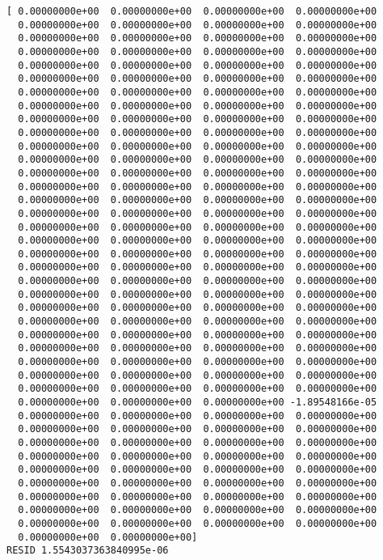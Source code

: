 \documentclass[11pt]{article}
\begin{document}
    \begin{Verbatim}[commandchars=\\\{\}]
[ 0.00000000e+00  0.00000000e+00  0.00000000e+00  0.00000000e+00
  0.00000000e+00  0.00000000e+00  0.00000000e+00  0.00000000e+00
  0.00000000e+00  0.00000000e+00  0.00000000e+00  0.00000000e+00
  0.00000000e+00  0.00000000e+00  0.00000000e+00  0.00000000e+00
  0.00000000e+00  0.00000000e+00  0.00000000e+00  0.00000000e+00
  0.00000000e+00  0.00000000e+00  0.00000000e+00  0.00000000e+00
  0.00000000e+00  0.00000000e+00  0.00000000e+00  0.00000000e+00
  0.00000000e+00  0.00000000e+00  0.00000000e+00  0.00000000e+00
  0.00000000e+00  0.00000000e+00  0.00000000e+00  0.00000000e+00
  0.00000000e+00  0.00000000e+00  0.00000000e+00  0.00000000e+00
  0.00000000e+00  0.00000000e+00  0.00000000e+00  0.00000000e+00
  0.00000000e+00  0.00000000e+00  0.00000000e+00  0.00000000e+00
  0.00000000e+00  0.00000000e+00  0.00000000e+00  0.00000000e+00
  0.00000000e+00  0.00000000e+00  0.00000000e+00  0.00000000e+00
  0.00000000e+00  0.00000000e+00  0.00000000e+00  0.00000000e+00
  0.00000000e+00  0.00000000e+00  0.00000000e+00  0.00000000e+00
  0.00000000e+00  0.00000000e+00  0.00000000e+00  0.00000000e+00
  0.00000000e+00  0.00000000e+00  0.00000000e+00  0.00000000e+00
  0.00000000e+00  0.00000000e+00  0.00000000e+00  0.00000000e+00
  0.00000000e+00  0.00000000e+00  0.00000000e+00  0.00000000e+00
  0.00000000e+00  0.00000000e+00  0.00000000e+00  0.00000000e+00
  0.00000000e+00  0.00000000e+00  0.00000000e+00  0.00000000e+00
  0.00000000e+00  0.00000000e+00  0.00000000e+00  0.00000000e+00
  0.00000000e+00  0.00000000e+00  0.00000000e+00  0.00000000e+00
  0.00000000e+00  0.00000000e+00  0.00000000e+00  0.00000000e+00
  0.00000000e+00  0.00000000e+00  0.00000000e+00  0.00000000e+00
  0.00000000e+00  0.00000000e+00  0.00000000e+00  0.00000000e+00
  0.00000000e+00  0.00000000e+00  0.00000000e+00  0.00000000e+00
  0.00000000e+00  0.00000000e+00  0.00000000e+00  0.00000000e+00
  0.00000000e+00  0.00000000e+00  0.00000000e+00 -1.89548166e-05
  0.00000000e+00  0.00000000e+00  0.00000000e+00  0.00000000e+00
  0.00000000e+00  0.00000000e+00  0.00000000e+00  0.00000000e+00
  0.00000000e+00  0.00000000e+00  0.00000000e+00  0.00000000e+00
  0.00000000e+00  0.00000000e+00  0.00000000e+00  0.00000000e+00
  0.00000000e+00  0.00000000e+00  0.00000000e+00  0.00000000e+00
  0.00000000e+00  0.00000000e+00  0.00000000e+00  0.00000000e+00
  0.00000000e+00  0.00000000e+00  0.00000000e+00  0.00000000e+00
  0.00000000e+00  0.00000000e+00  0.00000000e+00  0.00000000e+00
  0.00000000e+00  0.00000000e+00  0.00000000e+00  0.00000000e+00
  0.00000000e+00  0.00000000e+00]
RESID 1.5543037363840995e-06

    \end{Verbatim}
\end{document}
